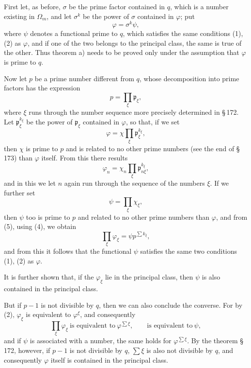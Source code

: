 \documentclass[11pt]{article}
\newcommand{\frp}{\mathfrak p}
\begin{document}
First let, as before, $\sigma$ be the prime factor contained in $q$, which is a number existing in $\Omega_m$, and let $\sigma^k$ be the power of $\sigma$ contained in $\varphi$; put
\begin{equation}
\varphi=\sigma^k\psi,
\tag{3}
\end{equation}
where $\psi$ denotes a functional prime to $q$, which satisfies the same conditions (1), (2) as $\varphi$, and if one of the two belongs to the principal class, the same is true of the other. Thus theorem a) needs to be proved only under the assumption that $\varphi$ is prime to $q$.

Now let $p$ be a prime number different from $q$, whose decomposition into prime factors has the expression
\begin{equation}
p=\prod_\xi \frp_\xi,
\tag{4}
\end{equation}
where $\xi$ runs through the number sequence more precisely determined in \S\,172. Let $\frp_\xi^{k_\xi}$ be the power of $\frp_\xi$ contained in $\varphi$, so that, if we set
\[
\varphi=\chi\prod_\xi \frp_\xi^{k_\xi},
\]
then $\chi$ is prime to $p$ and is related to no other prime numbers (see the end of \S\,173) than $\varphi$ itself. From this there results
\begin{equation}
\varphi_n=\chi_n\prod_\xi \frp_{n\xi}^{k_\xi},
\tag{5}
\end{equation}
and in this we let $n$ again run through the sequence of the numbers $\xi$. If we further set
\[
\psi=\prod_\xi \chi_\xi,
\]
then $\psi$ too is prime to $p$ and related to no other prime numbers than $\varphi$, and from (5), using (4), we obtain
\begin{equation}
\prod_\xi\varphi_\xi=\psi p^{\sum k_\xi},
\tag{6}
\end{equation}
and from this it follows that the functional $\psi$ satisfies the same two conditions (1), (2) as $\varphi$.

It is further shown that, if the $\varphi_\xi$ lie in the principal class, then $\psi$ is also contained in the principal class.

But if $p-1$ is not divisible by $q$, then we can also conclude the converse. For by (2), $\varphi_\xi$ is equivalent to $\varphi^\xi$, and consequently
\[
\prod_\xi\varphi_\xi\ \text{is equivalent to}\ \varphi^{\sum\xi},
\qquad
\text{is equivalent to}\ \psi,
\]
and if $\psi$ is associated with a number, the same holds for $\varphi^{\sum\xi}$. By the theorem \S\,172, however, if $p-1$ is not divisible by $q$, $\sum\xi$ is also not divisible by $q$, and consequently $\varphi$ itself is contained in the principal class.
\end{document}

